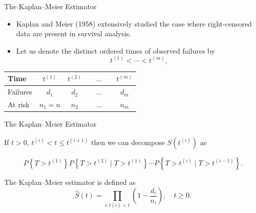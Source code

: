 \documentclass[12pt,t]{beamer}
\begin{document}
\begin{frame}[c]{The Kaplan--Meier Estimator}

\begin{itemize}
  \itemsep12pt
  \item Kaplan and Meier (1958) extensively studied the case where
    right-censored data are present in survival analysis.
  \item Let us denote the distinct ordered times of observed failures by
    $$t^{(1)}<\cdots< t^{(m)},$$
\end{itemize}

\begin{center}
\begin{tabular}{ | l | c | c | c | c | }
  \hline
    Time & $t^{(1)}$  & $t^{(2)}$ & $\quad \ldots \quad$ & $t^{(m)}$ \\ \hline
    Failures & $d_1$ & $d_2$ & $\quad \ldots \quad$ & $d_{m}$ \\ \hline
    At risk & $n_1 = n$  & $n_2$ & $\quad \ldots \quad$ & $n_m$\\
  \hline
\end{tabular}
\end{center}
\note{
}

\end{frame}



\begin{frame}[c]{The Kaplan--Meier Estimator}

If $t>0$, $t^{(i)} <t \leq t^{(i+1)}$ then we can decompose $S(t^{(i)})$ as

$$ P\left\{T> t^{(1)}\right\}P\left\{T>t^{(2)} \mid T>t^{(1)}\right\}\cdots
P\left\{ T> t^{(i)} \mid T> t^{(i-1)} \right\}.$$

The Kaplan--Meier estimator is defined as
$$
\widehat{S}(t) = \prod_{i : t(i) < t} \left(1 - \frac{d_i}{n_i}\right), \quad
t\geq 0.
$$

\note{
}

\end{frame}

\end{document}
